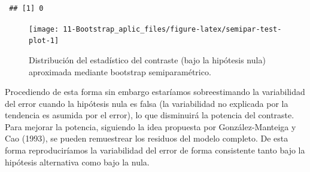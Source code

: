 \documentclass[
  10pt,
]{book}
\newenvironment{Shaded}{\begin{snugshade}}{\end{snugshade}}
\newcommand{\AttributeTok}[1]{\textcolor[rgb]{0.77,0.63,0.00}{#1}}
\newcommand{\CommentTok}[1]{\textcolor[rgb]{0.56,0.35,0.01}{\textit{#1}}}
\newcommand{\ConstantTok}[1]{\textcolor[rgb]{0.00,0.00,0.00}{#1}}
\newcommand{\DecValTok}[1]{\textcolor[rgb]{0.00,0.00,0.81}{#1}}
\newcommand{\FunctionTok}[1]{\textcolor[rgb]{0.00,0.00,0.00}{#1}}
\newcommand{\NormalTok}[1]{#1}
\newcommand{\OtherTok}[1]{\textcolor[rgb]{0.56,0.35,0.01}{#1}}
\newcommand{\SpecialCharTok}[1]{\textcolor[rgb]{0.00,0.00,0.00}{#1}}
\newcommand{\StringTok}[1]{\textcolor[rgb]{0.31,0.60,0.02}{#1}}
\theoremstyle{break}
\theoremstyle{nonumberplain}
\renewcommand{\CommentTok}[1]{\textcolor[rgb]{0.41,0.41,0.41}{\texttt{#1}}}
\begin{document}
\begin{Shaded}
\end{Shaded}

\begin{verbatim}
 ## [1] 0
\end{verbatim}

\begin{figure}[!htbp]

{\centering \texttt{[image: 11-Bootstrap\_aplic\_files/figure-latex/semipar-test-plot-1]} 

}

\caption{Distribución del estadístico del contraste (bajo la hipótesis nula) aproximada mediante bootstrap semiparamétrico.}\label{fig:semipar-test-plot}
\end{figure}

Procediendo de esta forma sin embargo estaríamos sobreestimando la variabilidad
del error cuando la hipótesis nula es falsa (la variabilidad no explicada por la
tendencia es asumida por el error), lo que disminuirá la potencia del contraste.
Para mejorar la potencia, siguiendo la idea propuesta por González-Manteiga
y Cao (1993), se pueden remuestrear los residuos del modelo completo.
De esta forma reproduciríamos la variabilidad del error de forma consistente
tanto bajo la hipótesis alternativa como bajo la nula.
\end{document}
